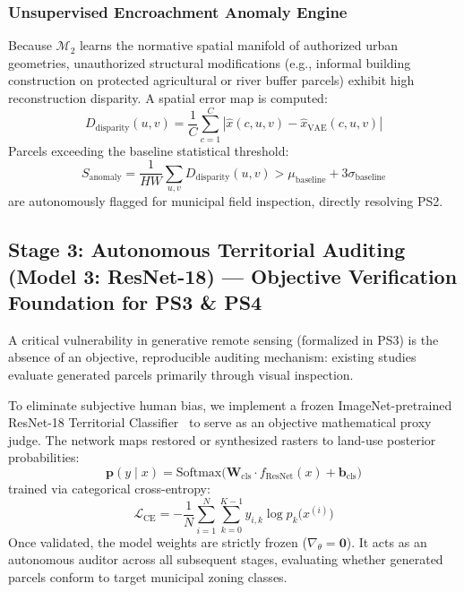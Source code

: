 \documentclass[journal]{IEEEtran}
\begin{document}
\subsubsection{Unsupervised Encroachment Anomaly Engine}
Because $\mathcal{M}_2$ learns the normative spatial manifold of authorized urban geometries, unauthorized structural modifications (e.g., informal building construction on protected agricultural or river buffer parcels) exhibit high reconstruction disparity. A spatial error map is computed:
\begin{equation}
D_{\text{disparity}}(u, v) = \frac{1}{C}\sum_{c=1}^C |\hat{x}(c, u, v) - \hat{x}_{\text{VAE}}(c, u, v)|
\label{eq:disparity_map}
\end{equation}
Parcels exceeding the baseline statistical threshold:
\begin{equation}
S_{\text{anomaly}} = \frac{1}{HW}\sum_{u, v} D_{\text{disparity}}(u, v) > \mu_{\text{baseline}} + 3\sigma_{\text{baseline}}
\label{eq:anomaly_flag}
\end{equation}
are autonomously flagged for municipal field inspection, directly resolving PS2.

\subsection{Stage 3: Autonomous Territorial Auditing (Model 3: ResNet-18) --- Objective Verification Foundation for PS3 \& PS4}
A critical vulnerability in generative remote sensing (formalized in PS3) is the absence of an objective, reproducible auditing mechanism: existing studies evaluate generated parcels primarily through visual inspection.

To eliminate subjective human bias, we implement a frozen ImageNet-pretrained ResNet-18 Territorial Classifier~\cite{he2016deep} to serve as an objective mathematical proxy judge. The network maps restored or synthesized rasters to land-use posterior probabilities:
\begin{equation}
\mathbf{p}(y \mid x) = \text{Softmax}\big(\mathbf{W}_{\text{cls}} \cdot f_{\text{ResNet}}(x) + \mathbf{b}_{\text{cls}}\big)
\label{eq:classifier}
\end{equation}
trained via categorical cross-entropy:
\begin{equation}
\mathcal{L}_{\text{CE}} = -\frac{1}{N} \sum_{i=1}^N \sum_{k=0}^{K-1} y_{i,k} \log p_k\big(x^{(i)}\big)
\label{eq:ce_loss}
\end{equation}
Once validated, the model weights are strictly frozen ($\nabla_\theta = \mathbf{0}$). It acts as an autonomous auditor across all subsequent stages, evaluating whether generated parcels conform to target municipal zoning classes.
\end{document}
